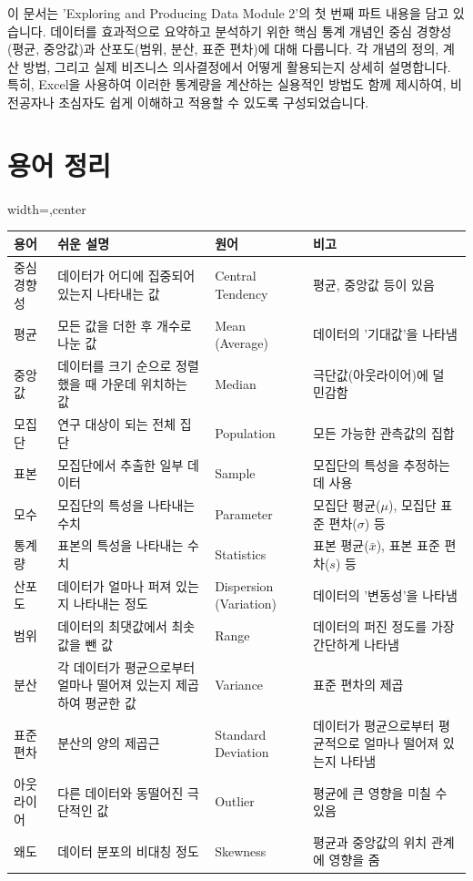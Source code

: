 \documentclass[11pt,a4paper]{article}
\begin{document}
\newpage
\begin{tcolorbox}[mybox={개요}]
이 문서는 'Exploring and Producing Data Module 2'의 첫 번째 파트 내용을 담고 있습니다.
데이터를 효과적으로 요약하고 분석하기 위한 핵심 통계 개념인 중심 경향성(평균, 중앙값)과 산포도(범위, 분산, 표준 편차)에 대해 다룹니다.
각 개념의 정의, 계산 방법, 그리고 실제 비즈니스 의사결정에서 어떻게 활용되는지 상세히 설명합니다.
특히, Excel을 사용하여 이러한 통계량을 계산하는 실용적인 방법도 함께 제시하여, 비전공자나 초심자도 쉽게 이해하고 적용할 수 있도록 구성되었습니다.
\end{tcolorbox}

\newpage
\section*{용어 정리}
\begin{adjustbox}{width=\textwidth,center}
\begin{tabular}{llll}
\toprule
\textbf{용어} & \textbf{쉬운 설명} & \textbf{원어} & \textbf{비고} \\
\midrule
중심 경향성 & 데이터가 어디에 집중되어 있는지 나타내는 값 & Central Tendency & 평균, 중앙값 등이 있음 \\
평균 & 모든 값을 더한 후 개수로 나눈 값 & Mean (Average) & 데이터의 '기대값'을 나타냄 \\
중앙값 & 데이터를 크기 순으로 정렬했을 때 가운데 위치하는 값 & Median & 극단값(아웃라이어)에 덜 민감함 \\
모집단 & 연구 대상이 되는 전체 집단 & Population & 모든 가능한 관측값의 집합 \\
표본 & 모집단에서 추출한 일부 데이터 & Sample & 모집단의 특성을 추정하는 데 사용 \\
모수 & 모집단의 특성을 나타내는 수치 & Parameter & 모집단 평균($\mu$), 모집단 표준 편차($\sigma$) 등 \\
통계량 & 표본의 특성을 나타내는 수치 & Statistics & 표본 평균($\bar{x}$), 표본 표준 편차($s$) 등 \\
산포도 & 데이터가 얼마나 퍼져 있는지 나타내는 정도 & Dispersion (Variation) & 데이터의 '변동성'을 나타냄 \\
범위 & 데이터의 최댓값에서 최솟값을 뺀 값 & Range & 데이터의 퍼진 정도를 가장 간단하게 나타냄 \\
분산 & 각 데이터가 평균으로부터 얼마나 떨어져 있는지 제곱하여 평균한 값 & Variance & 표준 편차의 제곱 \\
표준 편차 & 분산의 양의 제곱근 & Standard Deviation & 데이터가 평균으로부터 평균적으로 얼마나 떨어져 있는지 나타냄 \\
아웃라이어 & 다른 데이터와 동떨어진 극단적인 값 & Outlier & 평균에 큰 영향을 미칠 수 있음 \\
왜도 & 데이터 분포의 비대칭 정도 & Skewness & 평균과 중앙값의 위치 관계에 영향을 줌 \\
\bottomrule
\end{tabular}
\end{adjustbox}
\end{document}
